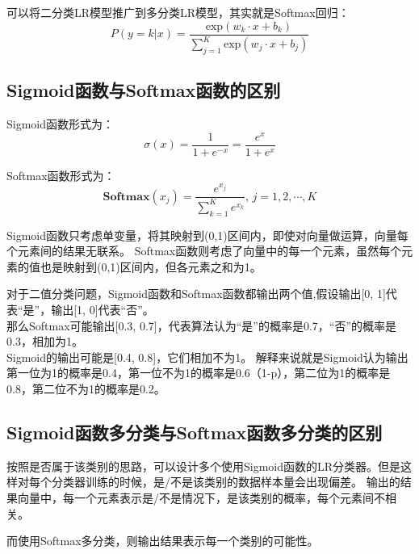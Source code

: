 可以将二分类LR模型推广到多分类LR模型，其实就是Softmax回归：
\begin{equation*}
    P(y=k|x) = \frac{\text{exp}(w_k\cdot x + b_k)}{\sum_{j=1}^K \text{exp}(w_j \cdot x + b_j)}
\end{equation*}

\subsection{Sigmoid函数与Softmax函数的区别}
Sigmoid函数形式为：
\begin{equation*}
    \sigma(x) = \frac{1}{1 + e^{-x}} = \frac{e^{x}}{1 + e^{x}}
\end{equation*}

Softmax函数形式为：
\begin{equation*}
    \textbf{Softmax}(x_j) = \frac{e^{x_j}}{\sum_{k=1}^K e^{x_k}},\, j=1,2,\cdots,K
\end{equation*}

Sigmoid函数只考虑单变量，将其映射到(0,1)区间内，即使对向量做运算，向量每个元素间的结果无联系。
Softmax函数则考虑了向量中的每一个元素，虽然每个元素的值也是映射到(0,1)区间内，但各元素之和为1。

对于二值分类问题，Sigmoid函数和Softmax函数都输出两个值,假设输出[0, 1]代表“是”，输出[1, 0]代表“否”。\\
那么Softmax可能输出[0.3, 0.7]，代表算法认为“是”的概率是0.7，“否”的概率是0.3，相加为1。\\
Sigmoid的输出可能是[0.4, 0.8]，它们相加不为1。
解释来说就是Sigmoid认为输出第一位为1的概率是0.4，第一位不为1的概率是0.6（1-p），第二位为1的概率是0.8，第二位不为1的概率是0.2。

\subsection{Sigmoid函数多分类与Softmax函数多分类的区别}
按照是否属于该类别的思路，可以设计多个使用Sigmoid函数的LR分类器。但是这样对每个分类器训练的时候，是/不是该类别的数据样本量会出现偏差。
输出的结果向量中，每一个元素表示是/不是情况下，是该类别的概率，每个元素间不相关。

而使用Softmax多分类，则输出结果表示每一个类别的可能性。

